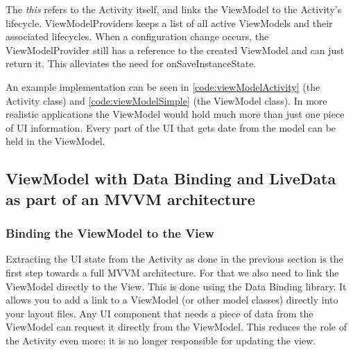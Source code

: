 The \textit{this} refers to the Activity itself, and links the ViewModel to the Activity's lifecycle.
ViewModelProviders keeps a list of all active ViewModels and their associated lifecycles. 
When a configuration change occurs, the ViewModelProvider still has a reference to the created ViewModel and can just return it.
This alleviates the need for onSaveInstanceState. 

An example implementation can be seen in \ref{code:viewModelActivity} (the Activity class) and \ref{code:viewModelSimple} (the ViewModel class).
In more realistic applications the ViewModel would hold much more than just one piece of UI information.
Every part of the UI that gets date from the model can be held in the ViewModel.





\subsection{ViewModel with Data Binding and LiveData as part of an MVVM architecture}
\subsubsection{Binding the ViewModel to the View}
Extracting the UI state from the Activity as done in the previous section is the first step towards a full MVVM architecture.
For that we also need to link the ViewModel directly to the View.
This is done using the Data Binding library\cite{dataBinding}.
It allows you to add a link to a ViewModel (or other model classes) directly into your layout files.
Any UI component that needs a piece of data from the ViewModel can request it directly from the ViewModel.
This reduces the role of the Activity even more: it is no longer responsible for updating the view.

